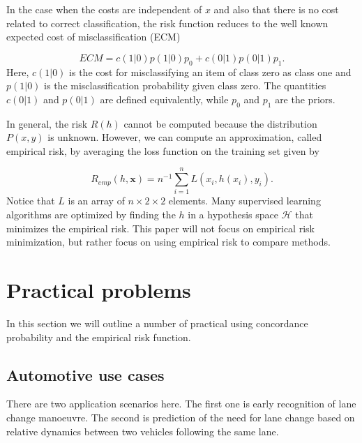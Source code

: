 \documentclass{article}
\theoremstyle{theorem}
\theoremstyle{definition}
\newcommand{\bv}[1]{\bm{#1}}
\begin{document}
In the case when the costs are independent of $x$ and also that there is no cost related to correct classification, the risk function reduces to the well known expected cost of misclassification (ECM)

\begin{equation}
\label{eq:ecm}
ECM =  c(1|0)p(1|0)p_0  + c(0|1)p(0|1)p_1.
\end{equation}
Here, $c(1|0)$ is the cost for misclassifying an item of class zero as class one and $p(1|0)$ is the misclassification probability given class zero.  The quantities $c(0|1)$ and $p(0|1)$ are defined equivalently, while $p_0$ and $p_1$ are the priors.  

In general, the risk $R(h)$ cannot be computed because the distribution $P(x, y)$ is unknown.  However, we can compute an approximation, called empirical risk, by averaging the loss function on the training set given by 

\begin{equation}
\label{def:empRisk}
R_{emp}(h, \bv{x}) = n^{-1} \sum_{i=1}^n L(x_i, h(x_i), y_i).
\end{equation}
Notice that $L$ is an array of $n \times 2\times 2$ elements.  Many supervised learning algorithms are optimized by finding the $h$ in a hypothesis space $\mathcal{H}$ that minimizes the empirical risk.  This paper will not focus on empirical risk minimization, but rather focus on using empirical risk to compare methods.
%



\section{Practical problems}
\label{sec:practicalEmpRisk}

In this section we will outline a number of practical using concordance probability and the empirical risk function.


\subsection{Automotive use cases }
\label{sec:automotive}

There are two application scenarios here.  The first one is early recognition of lane change manoeuvre. The second is prediction of the need for lane change based on relative dynamics between two vehicles following the same lane.
\end{document}
